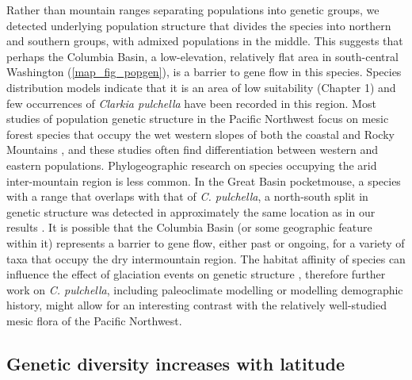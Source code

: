 \documentclass{article}
\begin{document}
Rather than mountain ranges separating populations into genetic groups, we detected underlying population structure that divides the species into northern and southern groups, with admixed populations in the middle. This suggests that perhaps the Columbia Basin, a low-elevation, relatively flat area in south-central Washington (\autoref{map_fig_popgen}), is a barrier to gene flow in this species. Species distribution models indicate that it is an area of low suitability (Chapter 1) and few occurrences of \textit{Clarkia pulchella} have been recorded in this region. Most studies of population genetic structure in the Pacific Northwest focus on mesic forest species that occupy the wet western slopes of both the coastal and Rocky Mountains \citep{shafer2010glaciers}, and these studies often find differentiation between western and eastern populations. Phylogeographic research on species occupying the arid inter-mountain region is less common. In the Great Basin pocketmouse, a species with a range that overlaps with that of \textit{C. pulchella}, a north-south split in genetic structure was detected in approximately the same location as in our results \citep{riddle2014cryptic}. It is possible that the Columbia Basin (or some geographic feature within it) represents a barrier to gene flow, either past or ongoing, for a variety of taxa that occupy the dry intermountain region. The habitat affinity of species can influence the effect of glaciation events on genetic structure \citep{massatti2014microhabitat}, therefore further work on \textit{C. pulchella}, including paleoclimate modelling or modelling demographic history, might allow for an interesting contrast with the relatively well-studied mesic flora of the Pacific Northwest. 

\subsection*{Genetic diversity increases with latitude}
\end{document}
